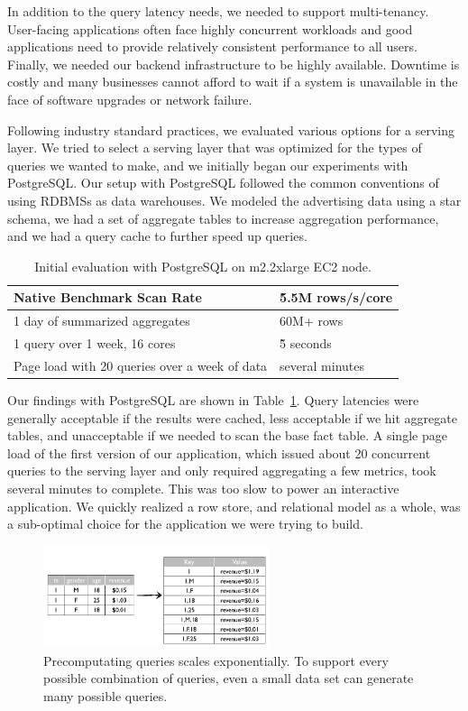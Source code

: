 \documentclass{vldb}
\begin{document}
{In addition to the query latency needs, we needed to support multi-tenancy.
User-facing applications often face highly concurrent workloads and good
applications need to provide relatively consistent performance to all users.
Finally, we needed our backend infrastructure to be highly available. Downtime
is costly and many businesses cannot afford to wait if a system is unavailable
in the face of software upgrades or network failure.

Following industry standard practices, we evaluated various options for a
serving layer. We tried to select a serving layer that was optimized for the
types of queries we wanted to make, and we initially began our experiments with
PostgreSQL\cite{stonebraker1987extendability}. Our setup with PostgreSQL
followed the common conventions of using RDBMSs as data warehouses. We modeled
the advertising data using a star schema, we had a set of aggregate tables to
increase aggregation performance, and we had a query cache to further speed up
queries.

\begin{table}
\centering
\scriptsize\begin{tabular}{| l | l |}
  \hline
  Native Benchmark Scan Rate & \~5.5M rows/s/core \\ \hline
  1 day of summarized aggregates & 60M+ rows \\ \hline
  1 query over 1 week, 16 cores & \~5 seconds \\ \hline
  Page load with 20 queries over a week of data & several minutes \\ \hline
\end{tabular}
\normalsize
\caption{Initial evaluation with PostgreSQL on m2.2xlarge EC2 node.}
\label{tab:postgres_results}
\end{table}

Our findings with PostgreSQL are shown in Table~\ref{tab:postgres_results}.
Query latencies were generally acceptable if the results were cached, less
acceptable if we hit aggregate tables, and unacceptable if we needed to scan
the base fact table. A single page load of the first version of our
application, which issued about 20 concurrent queries to the serving layer and
only required aggregating a few metrics, took several minutes to complete. This
was too slow to power an interactive application. We quickly realized a row
store, and relational model as a whole, was a sub-optimal choice for the
application we were trying to build.

\begin{figure}
\centering
\includegraphics[width = 2.6in]{precompute}
\caption{Precomputating queries scales exponentially. To support every possible
combination of queries, even a small data set can generate many possible
queries.
}
\label{fig:precompute}
\end{figure}

}
\end{document}
